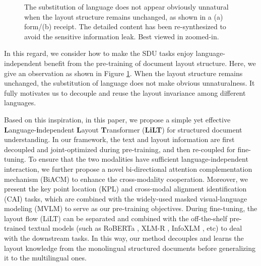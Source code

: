 \documentclass[11pt]{article}
\begin{document}
\begin{figure}[t!]
\centering
{}
\caption{The substitution of language does not appear obviously unnatural when the layout structure remains unchanged, as shown in a (a) form/(b) receipt. The detailed content has been re-synthesized to avoid the sensitive information leak. Best viewed in zoomed-in.}
\label{fig:docs}
\end{figure}

In this regard, we consider how to make the SDU tasks enjoy language-independent  benefit from   the   pre-training   of   document   layout structure. 
Here, we give an  observation as shown in Figure \ref{fig:docs}. When the layout structure remains unchanged, the substitution of language does not make obvious unnaturalness. It  fully motivates us to decouple and reuse the layout invariance among different languages. 



Based on this inspiration, in this paper, we propose a simple yet effective \textbf{L}anguage-\textbf{i}ndependent \textbf{L}ayout \textbf{T}ransformer (\textbf{LiLT}) for structured document understanding.
In our framework, the  text and layout information are first decoupled and joint-optimized during pre-training, and then re-coupled for fine-tuning. 
To ensure that the two modalities have sufficient language-independent interaction, we further propose a novel  bi-directional attention complementation mechanism (BiACM) to enhance the cross-modality cooperation. 
Moreover, we present the key point location (KPL) and 
cross-modal alignment identification (CAI)
tasks, which are combined with the widely-used masked visual-language modeling (MVLM) to serve as our pre-training objectives. 
During fine-tuning, 
the layout flow (LiLT) can be  separated and  combined with  the off-the-shelf pre-trained textual models (such as 
RoBERTa \cite{liu2019roberta}, XLM-R \cite{conneau2020unsupervised}, InfoXLM \cite{chi2021infoxlm}, etc) to deal with the downstream tasks. In this way, our method decouples and learns the layout knowledge from the monolingual structured documents before generalizing  it  to the multilingual ones.
\end{document}
